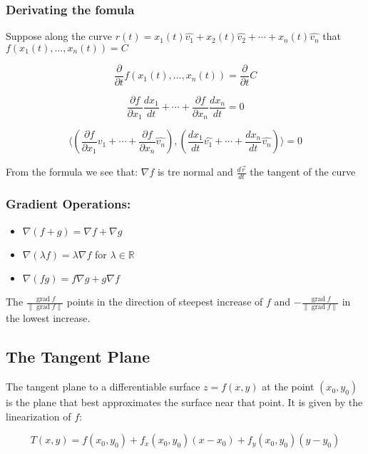 \subsubsection*{Derivating the fomula}

Suppose along the curve \(r(t) = x_1(t)\hat{v_1} + x_2(t)\hat{v_2} + \cdots + x_n(t)\hat{v_n}\) that \(f(x_1(t), \dots, x_n(t)) = C\)

\[
\frac{\partial}{\partial t}f(x_1(t), \dots, x_n(t)) = \frac{\partial}{\partial t}C
\]

\[
\frac{\partial f}{\partial x_1}\frac{dx_1}{dt} + \cdots + \frac{\partial f}{\partial x_n}\frac{dx_n}{dt} = 0
\]

\[
\langle \left(\frac{\partial f}{\partial x_1}\hat{v_1} + \cdots + \frac{\partial f}{\partial x_n}\hat{v_n}\right) , \left( \frac{dx_1}{dt}\hat{v_1} + \cdots + \frac{dx_n}{dt}\hat{v_n}\right)\rangle = 0
\]

From the formula we see that: \(\nabla f\) is tre normal and \(\frac{d\vec{r}}{dt}\) the tangent of the curve

\QED

\subsubsection{Gradient Operations:}
\begin{itemize}[label=\(-\)]
\item \( \nabla(f + g) = \nabla f + \nabla g \)
\item \( \nabla(\lambda f) = \lambda \nabla f \) for \( \lambda \in \mathbb{R} \)
\item \( \nabla(fg) = f \nabla g + g \nabla f \)
\end{itemize}

The \(\frac{\operatorname{grad}f}{\|\operatorname{grad}f\|}\) points in the direction of steepest increase of \( f \) and
 \(- \frac{\operatorname{grad}f}{\|\operatorname{grad}f\|}\) in the lowest increase.



\subsection{The Tangent Plane}

The tangent plane to a differentiable surface \( z = f(x, y) \) at the point \( (x_0, y_0) \) is the plane that best approximates the surface near that point. It is given by the linearization of \( f \):

\[
T(x, y) = f(x_0, y_0) + f_x(x_0, y_0)(x - x_0) + f_y(x_0, y_0)(y - y_0)
\]

